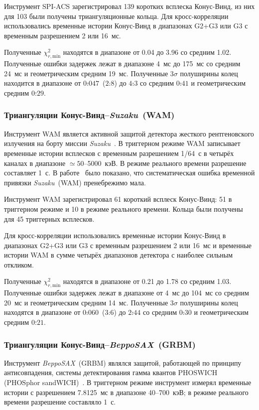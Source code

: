 Инструмент SPI-ACS зарегистрировал 139 коротких всплеска Конус-Винд, из них 
для 103 были получены триангуляционные кольца. Для кросс-корреляции использовались 
временные истории Конус-Винд в диапазонах G2+G3 или G3 с временным разрешением 2 или 16~мс.

Полученные $\chi^2_{r,\textrm{min}}$ находятся в диапазоне от 0.04 до 3.96 со средним 1.02. 
Полученные ошибки задержек лежат в диапазоне 4~мс до 175~мс со средним 24~мс 
и геометрическим средним 19~мс. Полученные $3\sigma$ полуширины колец находится 
в диапазоне от $0\overset{\circ}{.}047$~($2\overset{\prime}{.}8$) до $4\overset{\circ}{.}3$ 
со средним $0\overset{\circ}{.}41$ и геометрическим средним $0\overset{\circ}{.}29$.

\subsubsection{Триангуляции Конус-Винд--\textit{Suzaku}~(WAM)}
Инструмент WAM является активной защитой детектора жесткого рентгеновского 
излучения на борту миссии \textit{Suzaku}~\citep{Yamaoka_2009PASJ}. В триггерном 
режиме WAM записывает временные истории всплесков с временным разрешением 1/64~с 
в четырёх каналах в диапазоне $\simeq50$--5000~кэВ. В режиме реального времени 
разрешение составляет 1~с. В работе~\citep{Yamaoka_2009PASJ} было показано, 
что систематическая ошибка временной привязки \textit{Suzaku}~(WAM) пренебрежимо мала.

Инструмент WAM зарегистрировал 61 короткий всплеск Конус-Винд: 51 в триггерном 
режиме и 10 в режиме реального времени. Кольца были получены для 45 триггерных всплесков.

Для кросс-корреляции использовались временные истории Конус-Винд в 
диапазонах G2+G3 или G3 с временным разрешением 2 или 16~мс и временные истории 
WAM в сумме четырёх диапазонов детектора с наиболее сильным откликом.

Полученные $\chi^2_{r,\textrm{min}}$ находятся в диапазоне от 0.21 до 1.78 со средним 1.03. 
Полученные ошибки задержек лежат в диапазоне от 4~мс до 104~мс со средним 20~мс 
и геометрическим средним 14~мс. Полученные $3\sigma$ полуширины колец находятся 
в диапазоне от $0\overset{\circ}{.}060$~($3\overset{\prime}{.}6$) до $2\overset{\circ}{.}44$ 
со средним $0\overset{\circ}{.}30$ и геометрическим средним $0\overset{\circ}{.}21$.

\subsubsection{Триангуляции Конус-Винд--\textit{BeppoSAX}~(GRBM)}
Инструмент \textit{BeppoSAX}~(GRBM) являлся защитой, работающей по принципу 
антисовпадения, системы детектирования гамма квантов PHOSWICH 
(PHOSphor sandWICH)~\citep{Feroci_1997SPIE, Frontera_1997AAS}. В триггерном режиме 
инструмент измерял временные истории с разрешением 7.8125~мс в диапазоне 40--700~кэВ; 
в режиме реального времени разрешение составляло 1~с.

